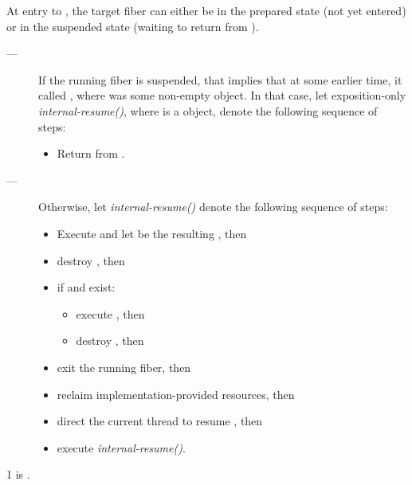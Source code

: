 At entry to \resumewith, the target fiber can either be in the prepared state
(not yet entered) or in the suspended state (waiting to return from \resumewith).

\begin{description}
    \item[---]
          If the running fiber is suspended, that implies that at some earlier
          time, it called \resumewith[other], where  was some
          non-empty \fiber object. In that case, let
          exposition-only \emph{internal-resume()},
          where  is a \fiber object, denote the following sequence
          of steps:
        \begin{itemize}
            \item Return  from \resumewith[other].
        \end{itemize}   
    \item[---] Otherwise, let \emph{internal-resume()}
          denote the following sequence of steps:
        \begin{itemize}
            \item Execute
                  and let  be the resulting \fiber, then
            \item destroy , then
            \item if  and  exist:
                \begin{itemize}
                    \item execute , then
                    \item destroy , then
                \end{itemize}
            \item exit the running fiber, then
            \item reclaim implementation-provided resources, then
            \item direct the current thread to resume , then
            \item execute \emph{internal-resume()}.
        \end{itemize}
\end{description}

1 \mandates
{} is \true.

